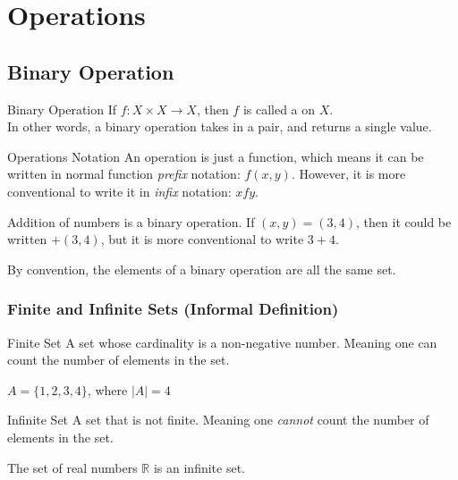 \documentclass[../notes.tex]{subfiles}
\begin{document}
	\ifSubfilesClassLoaded{\setcounter{chapter}{7}}{}
	\chapter{Operations}
		\section{Binary Operation}
			\begin{definition}[width=0.9\textwidth]{Binary Operation}
				If $f: X \times X \rightarrow X$, then $f$ is called a  on $X$.\\
				In other words, a binary operation takes in a pair, and returns a single value.
			\end{definition}
			\begin{sidenote}{Operations Notation}
				An operation is just a function, which means it can be written in normal function \emph{prefix} notation: $f(x, y)$. However, it is more conventional to write it in \emph{infix} notation: $x f y$.
				\begin{example}
					Addition of numbers is a binary operation. If $(x, y) = (3, 4)$, then it could be written $+(3, 4)$, but it is more conventional to write $3 + 4$.
				\end{example}
			\end{sidenote}
			By convention, the elements of a binary operation are all the same set.
			\subsection[Finite and Infinite Sets]{Finite and Infinite Sets (Informal Definition)}
				\begin{definition}[width=0.8\textwidth]{Finite Set}
					A set whose cardinality is a non-negative number. Meaning one can count the number of elements in the set.\par
					\begin{example}[hbox]
						$A = \{1, 2, 3, 4\}$, where $\left\lvert A\right\rvert = 4$
					\end{example}
				\end{definition}
				\begin{definition}[width=0.8\textwidth]{Infinite Set}
					A set that is not finite. Meaning one \emph{cannot} count the number of elements in the set.\par
					\begin{example}[hbox]
						The set of real numbers $\mathbb{R}$ is an infinite set.
					\end{example}
				\end{definition}
			\pagebreak
\end{document}
